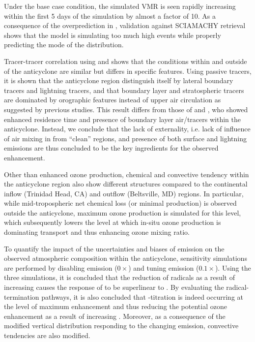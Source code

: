 Under the base case condition, the simulated  VMR is seen rapidly increasing within the first 5
days of the simulation by almost a factor of 10. As a consequence of the overprediction in {\lnox}, validation
against SCIAMACHY  retrieval shows that the model is simulating too much high 
events while properly predicting the mode of the distribution.

Tracer-tracer correlation using  and  shows that the conditions within and outside of the
anticyclone are similar but differs in specific features. Using passive tracers, it is shown that the anticyclone region
distinguish itself by lateral boundary tracers and lightning tracers, and that boundary layer and stratospheric tracers
are dominated by orographic features instead of upper air circulation as suggested by previous studies. This result
differs from those of \citet{Cooper:2007cr} and \citet{Barth:2012qf}, who showed enhanced residence time and presence
of boundary layer air/tracers within the anticyclone. Instead, we conclude that the
lack of externality, i.e. lack of influence of air mixing in from ``clean'' regions, and presence of both surface and lightning
emissions are thus concluded to be the key ingredients for the observed enhancement.

Other than enhanced ozone production, chemical and convective tendency within the anticyclone region also
show different structures compared to the continental inflow (Trinidad Head, CA) and outflow (Beltsville, MD)
regions. In particular, while mid-tropospheric net chemical loss (or minimal production) is observed outside
the anticyclone, maximum ozone production is simulated for this level, which subsequently lowers the level
at which in-situ ozone production is dominating transport and thus enhancing ozone mixing ratio.

To quantify the impact of the uncertainties and biases of {\lnox} emission on the observed atmospheric composition
within the anticyclone, sensitivity simulations are performed by disabling emission ($0\times$) and tuning emission
($0.1\times$). Using the three simulations, it is concluded that the reduction of  radicals as a result of
increasing  causes the response of  to be superlinear to {\lnox}. By evaluating the
radical-termination pathways, it is also concluded that -titration is indeed occurring at the level of
maximum  enhancement and thus reducing the potential ozone enhancement as a result of increasing
{\lnox}. Moreover, as a consequence of the modified vertical distribution responding to the changing {\lnox} emission,
convective tendencies are also modified.

